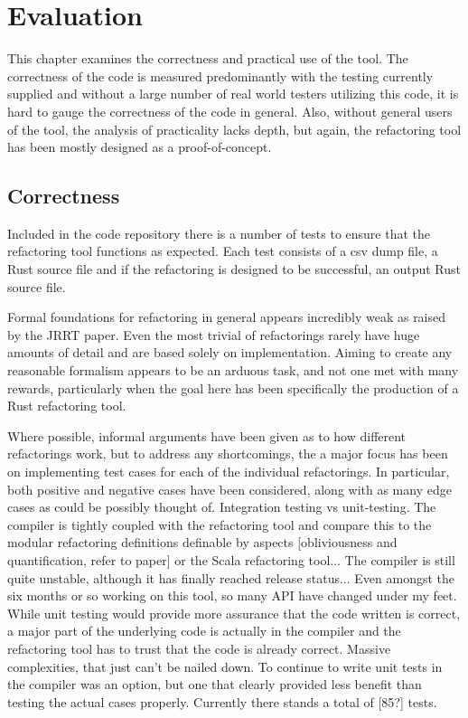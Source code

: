 \chapter{Evaluation}\label{C:eval}
This chapter examines the correctness and practical use of the tool. The correctness of the code is measured predominantly with the testing currently supplied and without a large number of real world testers utilizing this code, it is hard to gauge the correctness of the code in general. Also, without general users of the tool, the analysis of practicality lacks depth, but again, the refactoring tool has been mostly designed as a proof-of-concept.

\section{Correctness}
Included in the code repository there is a number of tests to ensure that the refactoring tool functions as expected. Each test consists of a csv dump file, a Rust source file and if the refactoring is designed to be successful, an output Rust source file. 

Formal foundations for refactoring in general appears incredibly weak as raised by the JRRT paper. Even the most trivial of refactorings rarely have huge amounts of detail and are based solely on implementation. Aiming to create any reasonable formalism appears to be an arduous task, and not one met with many rewards, particularly when the goal here has been specifically the production of a Rust refactoring tool. 

Where possible, informal arguments have been given as to how different refactorings work, but to address any shortcomings, the a major focus has been on implementing test cases for each of the individual refactorings. In particular, both positive and negative cases have been considered, along with as many edge cases as could be possibly thought of. Integration testing vs unit-testing. The compiler is tightly coupled with the refactoring tool and compare this to the modular refactoring definitions definable by aspects [obliviousness and quantification, refer to paper] or the Scala refactoring tool... The compiler is still quite unstable, although it has finally reached release status... Even amongst the six months or so working on this tool, so many API have changed under my feet. While unit testing would provide more assurance that the code written is correct, a major part of the underlying code is actually in the compiler and the refactoring tool has to trust that the code is already correct. Massive complexities, that just can't be nailed down. To continue to write unit tests in the compiler was an option, but one that clearly provided less benefit than testing the actual cases properly. Currently there stands a total of [85?] tests.

